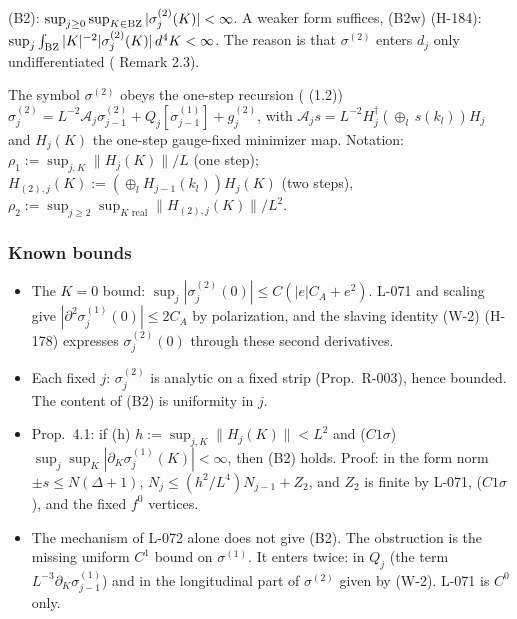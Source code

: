 (B2): $\sup_{j\ge0}\sup_{K\in\mathrm{BZ}}|\sigma_j^{(2)}(K)|<\infty$. A weaker form suffices, (B2w) (H-184): $\sup_j\int_{\mathrm{BZ}}|K|^{-2}|\sigma_j^{(2)}(K)|\,d^4K<\infty$. The reason is that $\sigma^{(2)}$ enters $d_j$ only undifferentiated ( Remark 2.3).

The symbol $\sigma^{(2)}$ obeys the one-step recursion ( (1.2)) $\sigma_j^{(2)}=L^{-2}\mathcal A_j\sigma_{j-1}^{(2)}+Q_j[\sigma_{j-1}^{(1)}]+g_j^{(2)}$, with $\mathcal A_js=L^{-2}H_j^\dagger(\oplus_l\,s(k_l))H_j$ and $H_j(K)$ the one-step gauge-fixed minimizer map. Notation: $\rho_1:=\sup_{j,K}\|H_j(K)\|/L$ (one step); $H_{(2),j}(K):=(\oplus_lH_{j-1}(k_l))H_j(K)$ (two steps), $\rho_2:=\sup_{j\ge2}\sup_{K\text{ real}}\|H_{(2),j}(K)\|/L^2$.

\subsubsection{Known bounds}\label{sec:B2proved}
\begin{itemize}
\item The $K=0$ bound: $\sup_j|\sigma_j^{(2)}(0)|\le C(|e|C_A+e^2)$. L-071 and scaling give $|\partial^2\sigma_j^{(1)}(0)|\le2C_A$ by polarization, and the slaving identity (W-2) (H-178) expresses $\sigma_j^{(2)}(0)$ through these second derivatives.
\item Each fixed $j$: $\sigma_j^{(2)}$ is analytic on a fixed strip (Prop.\ R-003), hence bounded. The content of (B2) is uniformity in $j$.
\item Prop.\ 4.1: if (h) $h:=\sup_{j,K}\|H_j(K)\|<L^2$ and ($C1\sigma$) $\sup_j\sup_K|\partial_K\sigma_j^{(1)}(K)|<\infty$, then (B2) holds. Proof: in the form norm $\pm s\le N(\Delta+1)$, $N_j\le(h^2/L^4)N_{j-1}+Z_2$, and $Z_2$ is finite by L-071, ($C1\sigma$), and the fixed $f^0$ vertices.
\item The mechanism of L-072 alone does not give (B2). The obstruction is the missing uniform $C^1$ bound on $\sigma^{(1)}$. It enters twice: in $Q_j$ (the term $L^{-3}\partial_K\sigma_{j-1}^{(1)}$) and in the longitudinal part of $\sigma^{(2)}$ given by (W-2). L-071 is $C^0$ only.
\end{itemize}

